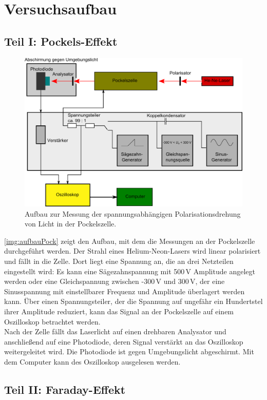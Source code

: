 \section{Versuchsaufbau}

\subsection{Teil I: Pockels-Effekt}
\begin{figure}[H]
\begin{center}
  \includegraphics[width=\textwidth]{../img/aufbauPock.pdf}
  \caption{Aufbau zur Messung der spannungsabhängigen Polarisationsdrehung von Licht in der Pockelszelle.}
  \label{img:aufbauPock}
\end{center}
\end{figure}
\autoref{img:aufbauPock} zeigt den Aufbau, mit dem die Messungen an der Pockelszelle durchgeführt werden.
Der Strahl eines Helium-Neon-Lasers wird linear polarisiert und fällt in die Zelle.
Dort liegt eine Spannung an, die an drei Netzteilen eingestellt wird:
Es kann eine Sägezahnspannung mit 500\,V Amplitude angelegt werden oder
eine Gleichspannung zwischen -300\,V und 300\,V,
der eine Sinusspannung mit einstellbarer Frequenz und Amplitude überlagert werden kann.
Über einen Spannungsteiler, der die Spannung auf ungefähr ein Hundertstel ihrer Amplitude reduziert,
kann das Signal an der Pockelszelle auf einem Oszilloskop betrachtet werden.\\
Nach der Zelle fällt das Laserlicht auf einen drehbaren Analysator und anschließend auf eine Photodiode,
deren Signal verstärkt an das Oszilloskop weitergeleitet wird.
Die Photodiode ist gegen Umgebungslicht abgeschirmt.
Mit dem Computer kann des Oszilloskop ausgelesen werden.


\subsection{Teil II: Faraday-Effekt}
